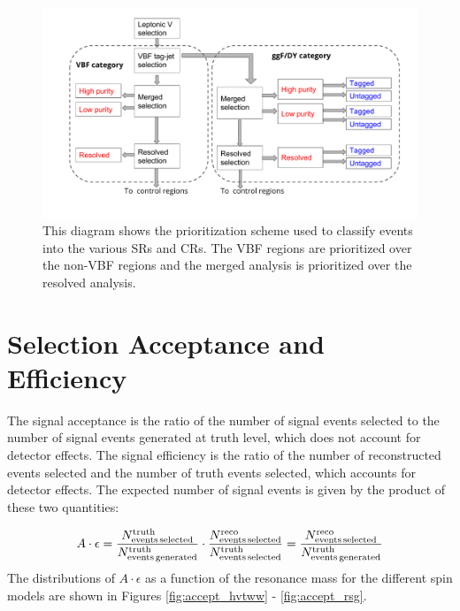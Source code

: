 \begin{figure}[h!]
  \centering
  \includegraphics[width=\hsize]{figures/Analysis/cutflow.pdf}  
  \caption{This diagram shows the prioritization scheme used to classify events into the various SRs and CRs. The VBF regions are prioritized over the non-VBF regions and the merged analysis is prioritized over the resolved analysis.} 

  \label{fig:cutflow}
\end{figure} 
\FloatBarrier

\section{Selection Acceptance and Efficiency}
The signal acceptance is the ratio of the number of signal events selected to the number of signal events generated at truth level, which does not account for detector effects. The signal efficiency is the ratio of the number of reconstructed events selected and the number of truth events selected, which accounts for detector effects. The expected number of signal events is given by the product of these two quantities:

\begin{equation}
A \cdot \epsilon = \frac{N^{\mathrm{truth}}_{\mathrm{events\, selected}}}{N^{\mathrm{truth}}_{\mathrm{events\, generated}}} \cdot \frac{N^{\mathrm{reco}}_{\mathrm{events\, selected}}}{N^{\mathrm{truth}}_{\mathrm{events\, selected}}}
\\
= \frac{N^{\mathrm{reco}}_{\mathrm{events\, selected}}}{N^{\mathrm{truth}}_{\mathrm{events\, generated}}}
\end{equation}
The distributions of $A\cdot \epsilon$ as a function of the resonance mass for the different spin models are shown in Figures \ref{fig:accept_hvtww} - \ref{fig:accept_rsg}.

